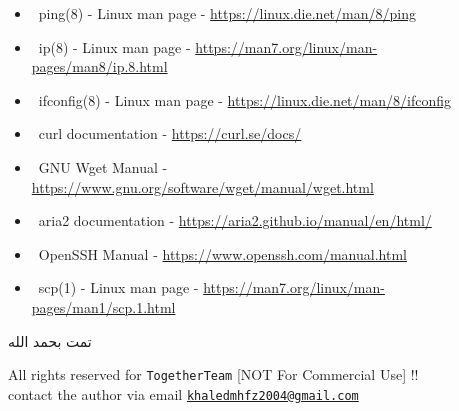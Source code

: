 \documentclass[12pt]{article}
\newcommand{\referenceicon}{\faLink}
\begin{document}
\begin{scriptsize}
\begin{itemize}
    \item \referenceicon\ ping(8) - Linux man page - \href{https://linux.die.net/man/8/ping}{https://linux.die.net/man/8/ping}
    \item \referenceicon\ ip(8) - Linux man page - \href{https://man7.org/linux/man-pages/man8/ip.8.html}{https://man7.org/linux/man-pages/man8/ip.8.html}
    \item \referenceicon\ ifconfig(8) - Linux man page - \href{https://linux.die.net/man/8/ifconfig}{https://linux.die.net/man/8/ifconfig}
    \item \referenceicon\ curl documentation - \href{https://curl.se/docs/}{https://curl.se/docs/}
    \item \referenceicon\ GNU Wget Manual - \href{https://www.gnu.org/software/wget/manual/wget.html}{https://www.gnu.org/software/wget/manual/wget.html}
    \item \referenceicon\ aria2 documentation - \href{https://aria2.github.io/manual/en/html/}{https://aria2.github.io/manual/en/html/}
    \item \referenceicon\ OpenSSH Manual - \href{https://www.openssh.com/manual.html}{https://www.openssh.com/manual.html}
    \item \referenceicon\ scp(1) - Linux man page - \href{https://man7.org/linux/man-pages/man1/scp.1.html}{https://man7.org/linux/man-pages/man1/scp.1.html}
\end{itemize}
\end{scriptsize}

\begin{infobox}
\centering
\Large\textcolor{teamred}{\textarabic{تمت بحمد الله}}
\end{infobox}

\vspace{\fill}
\begin{center}
\color{muted}
All rights reserved for \texttt{TogetherTeam} [NOT For Commercial Use] !!\\
contact the author via email \href{mailto:khaledmhfz2004@gmail.com}{\texttt{khaledmhfz2004@gmail.com}}
\end{center}
\end{document}
